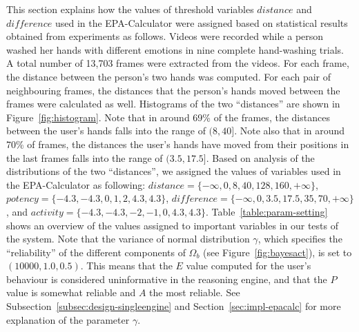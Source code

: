 This section explains how the values of threshold variables $distance$ and $\mathit{difference}$ used in the EPA-Calculator were assigned based on statistical results obtained from experiments as follows. Videos were recorded while a person washed her hands with different emotions in nine complete hand-washing trials. A total number of 13,703 frames were extracted from the videos. For each frame, the distance between the person's two hands was computed. For each pair of neighbouring frames, the distances that the person's hands moved between the frames were calculated as well. Histograms of the two ``distances'' are shown in Figure~\ref{fig:histogram}. Note that in around 69\% of the frames, the distances between the user's hands falls into the range of $(8, 40]$. Note also that in around 70\% of frames, the distances the user's hands have moved from their positions in the last frames falls into the range of $(3.5, 17.5]$. Based on analysis of the distributions of the two ``distances'', we assigned the values of variables used in the EPA-Calculator as following: $distance = \{-\infty, 0, 8, 40, 128, 160, +\infty\}$, $potency = \{-4.3, -4.3, 0, 1, 2, 4.3, 4.3\}$, $difference = \{-\infty, 0, 3.5, 17.5, 35, 70, +\infty\}$, and $activity = \{-4.3, -4.3, -2, -1, 0, 4.3, 4.3\}$. Table~\ref{table:param-setting} shows an overview of the values assigned to important variables in our tests of the system. Note that the variance of normal distribution $\gamma$, which specifies the ``reliability'' of the different components of $\Omega_b$ (see Figure~\ref{fig:bayesact}), is set to $(10000,1.0,0.5)$. This means that the $E$ value computed for the user's behaviour is considered uninformative in the reasoning engine, and that the $P$ value is somewhat reliable and $A$ the most reliable. See Subsection~\ref{subsec:design-singleengine} and Section~\ref{sec:impl-epacalc} for more explanation of the parameter $\gamma$.

